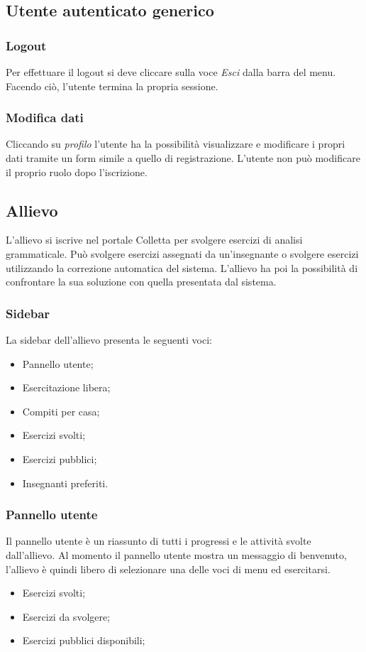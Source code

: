 \subsection{Utente autenticato generico}

    \subsubsection{Logout}
    Per effettuare il {logout} si deve cliccare sulla voce \textit{Esci} dalla barra del menu. Facendo ciò, l'utente termina la propria sessione.
    \subsubsection{Modifica dati}
    Cliccando su \textit{profilo} l'utente ha la possibilità visualizzare e modificare i propri dati tramite un form simile a quello di registrazione. L'utente non può modificare il proprio ruolo dopo l'iscrizione.

    \subsection{Allievo}
      L'allievo si iscrive nel portale Colletta per svolgere esercizi di analisi grammaticale. Può svolgere esercizi assegnati da un'insegnante o svolgere esercizi utilizzando la correzione automatica del sistema. L'allievo ha poi la possibilità di confrontare la sua soluzione con quella presentata dal sistema.
        \subsubsection{Sidebar}
          La sidebar dell'allievo presenta le seguenti voci:
            \begin{itemize}
                \item Pannello utente;
                \item Esercitazione libera;
                \item Compiti per casa;
                \item Esercizi svolti;
                \item Esercizi pubblici;
                \item Insegnanti preferiti.
            \end{itemize}
            

            
        \subsubsection{Pannello utente}
          Il pannello utente è un riassunto di tutti i progressi e le attività svolte dall'allievo. Al momento il pannello utente mostra un messaggio di benvenuto, l'allievo è quindi libero di selezionare una delle voci di menu ed esercitarsi.
        	\begin{itemize}
        		\item Esercizi svolti;
        		\item Esercizi da svolgere;
        		\item Esercizi pubblici disponibili;
        	\end{itemize}
        
